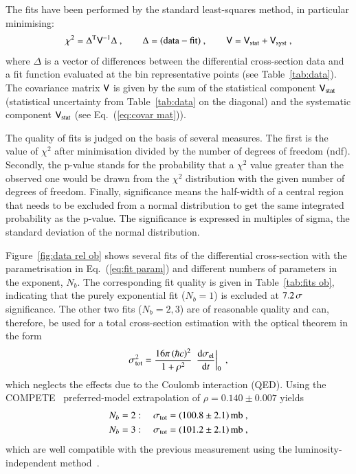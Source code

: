 The fits have been performed by the standard least-squares method, in particular minimising:
\begin{equation}
\label{eq:chi sq}
	\chi^2 = \Delta^{\rm T} \mathsf{V}^{-1} \Delta\ ,\qquad
	\Delta = (\hbox{data} - \hbox{fit})\ ,\qquad
	\mathsf{V} = \mathsf{V}_{\rm stat} + \mathsf{V}_{\rm syst}\ ,
\end{equation}
where $\Delta$ is a vector of differences between the differential cross-section data and a fit function evaluated at the bin representative points (see Table~\ref{tab:data}). The covariance matrix $\mathsf{V}$ is given by the sum of the statistical component $\mathsf{V}_{\rm stat}$ (statistical uncertainty from Table~\ref{tab:data} on the diagonal) and the systematic component $\mathsf{V}_{\rm stat}$ (see Eq.~(\ref{eq:covar mat})).

The quality of fits is judged on the basis of several measures. The first is the value of $\chi^2$ after minimisation divided by the number of degrees of freedom (ndf). Secondly, the p-value stands for the probability that a $\chi^2$ value greater than the observed one would be drawn from the $\chi^2$ distribution with the given number of degrees of freedom. Finally, significance means the half-width of a central region that needs to be excluded from a normal distribution to get the same integrated probability as the p-value. The significance is expressed in multiples of sigma, the standard deviation of the normal distribution.

Figure~\ref{fig:data rel ob} shows several fits of the differential cross-section with the parametrisation in Eq.~(\ref{eq:fit param}) and different numbers of parameters in the exponent, $N_b$. The corresponding fit quality is given in Table~\ref{tab:fits ob}, indicating that the purely exponential fit ($N_b = 1$) is excluded at $7.2\,{\rm \sigma}$ significance.
%
The other two fits ($N_b = 2, 3$) are of reasonable quality and can, therefore, be used for a total cross-section estimation with the optical theorem in the form
\begin{equation}
\label{eq:si tot}
\sigma_{\rm tot}^2 = {16\pi\, (\hbar c)^2\over 1 + \rho^2}\, \left. {\rm d}\sigma_{\rm el}\over{\rm d} t\right|_0\ ,
\end{equation}
which neglects the effects due to the Coulomb interaction (QED).
Using the COMPETE~\cite{compete} preferred-model extrapolation of $\rho = 0.140\pm 0.007$ yields
\begin{equation}
\label{eq:si tot results}
	\begin{aligned}
		N_b &= 2:\quad \sigma_{\rm tot} = (100.8 \pm 2.1)\un{mb}\ ,\\	%
		N_b &= 3:\quad \sigma_{\rm tot} = (101.2 \pm 2.1)\un{mb}\ ,\\	%
	\end{aligned}
\end{equation}
which are well compatible with the previous measurement using the luminosity-independent method~\cite{prl111}.


